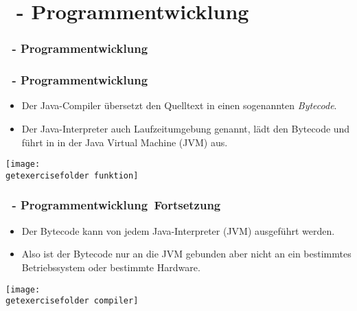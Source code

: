 \def\stitle{\theexercise\ - Programmentwicklung}
\section{\stitle}
\begin{frame}%
  \frametitle{\stitle}%
\tableofcontents[current]
\end{frame}


\begin{frame}%
  \frametitle{\stitle}%


\begin{itemize}
\item Der Java-Compiler übersetzt den Quelltext in einen sogenannten \emph{Bytecode}.
\item Der Java-Interpreter auch Laufzeitumgebung genannt, lädt den Bytecode und führt in in der Java Virtual Machine (JVM) aus.
\end{itemize}
\texttt{[image: \\getexercisefolder funktion]}

\end{frame}


\begin{frame}[t]%
  \frametitle{\stitle\ Fortsetzung}%


\begin{itemize}
\item Der Bytecode kann von jedem Java-Interpreter (JVM) ausgeführt werden.
\item Also ist der Bytecode nur an die JVM gebunden aber nicht an ein bestimmtes Betriebssystem oder bestimmte Hardware.
\end{itemize}
\centering
\texttt{[image: \\getexercisefolder compiler]}

\end{frame}